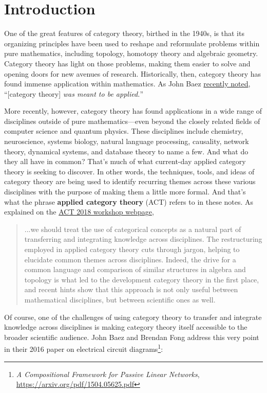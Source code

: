 \documentclass{tufte-handout-tai}
\theoremstyle{plain}
\theoremstyle{definition}
\theoremstyle{remark}
\begin{document}
\newpage
\section*{Introduction}
\begin{fullwidth}
One of the great features of category theory, birthed in the 1940s, is that its organizing principles have been used to reshape and reformulate problems within pure mathematics, including topology, homotopy theory and algebraic geometry. Category theory has light on those problems, making them easier to solve and opening doors for new avenues of research. Historically, then, category theory has found immense application within mathematics. As John Baez \href{https://forum.azimuthproject.org/discussion/1808/lecture-2-what-is-applied-category-theory}{recently noted}, ``[category theory] \textit{was meant to be applied.}'' 

More recently, however, category theory has found applications in a wide range of disciplines outside of pure mathematics---even beyond the closely related fields of computer science and quantum physics. These disciplines include chemistry, neuroscience, systems biology, natural language processing, causality, network theory, dynamical systems, and database theory to name a few. And what do they all have in common? That's much of what current-day applied category theory is seeking to discover. In other words, the techniques, tools, and ideas of category theory are being used to identify recurring themes across these various disciplines with the purpose of making them a little more formal. And that's what the phrase \textbf{applied category theory} (ACT) refers to in these notes. As explained on the \href{http://www.appliedcategorytheory.org/workshops/}{ACT 2018 workshop webpage},
	\begin{quote}
	...we should treat the use of categorical concepts as a natural part of transferring and integrating knowledge across disciplines. The restructuring employed in applied category theory cuts through jargon, helping to elucidate common themes across disciplines. Indeed, the drive for a common language and comparison of similar structures in algebra and topology is what led to the development category theory in the first place, and recent hints show that this approach is not only useful between mathematical disciplines, but between scientific ones as well.
	\end{quote}

Of course, one of the challenges of using category theory to transfer and integrate knowledge across disciplines is making category theory itself accessible to the broader scientific audience. John Baez and Brendan Fong address this very point in their 2016 paper on electrical circuit diagrams\footnote[][2cm]{\textit{A Compositional Framework for Passive Linear Networks}, \href{https://arxiv.org/pdf/1504.05625.pdf}{https://arxiv.org/pdf/1504.05625.pdf}}: 
\end{fullwidth}
\end{document}
